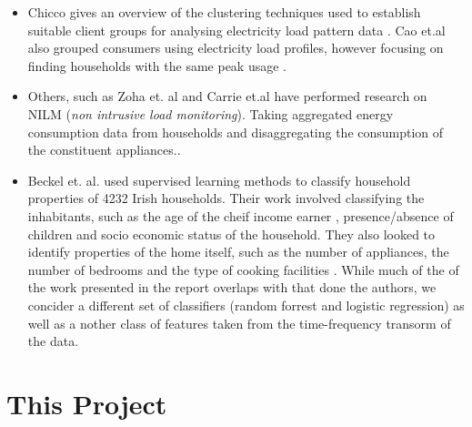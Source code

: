 \begin{itemize}
\item Chicco gives an overview of the clustering techniques used to establish suitable client groups for analysing electricity load pattern data \cite{Chicco}. Cao et.al also grouped consumers using electricity load profiles, however focusing on finding households with the same peak usage \cite{Cao}. 
\item Others, such as Zoha et. al and Carrie et.al have performed research on NILM (\textit{non intrusive load monitoring}). Taking aggregated energy consumption data from households and disaggregating the consumption of the constituent appliances.\cite{Zoha}\cite{Carrie}. 
 
\item Beckel et. al. used supervised learning methods to classify household properties of 4232 Irish households. Their work involved classifying the inhabitants, such as the age of the cheif income earner , presence/absence of children and socio economic status of the household. They also looked to identify properties of the home itself, such as the number of appliances, the number of bedrooms and the type of cooking facilities \cite{Beckel_3}. While much of the of the work presented in the report overlaps with that done the authors, we concider a different set of classifiers (random forrest and logistic regression) as well as a nother class of features taken from the time-frequency transorm of the data.
\end{itemize}


\section{This Project}

